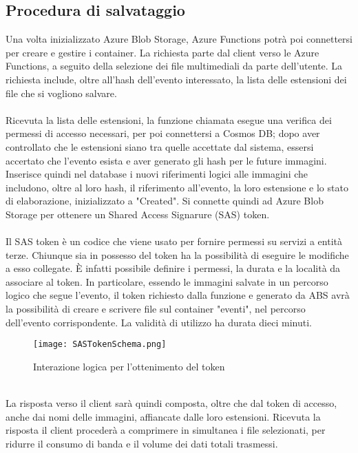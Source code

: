 \subsection{Procedura di salvataggio}

Una volta inizializzato Azure Blob Storage,
Azure Functions potrà poi connettersi per creare e gestire i container.
La richiesta parte dal client verso le Azure Functions, 
a seguito della selezione dei file multimediali da parte dell'utente.
La richiesta include, oltre all'hash dell'evento interessato, la lista delle estensioni dei file che si vogliono salvare.\\
\\
Ricevuta la lista delle estensioni, 
la funzione chiamata esegue una verifica dei permessi di accesso necessari,
per poi connettersi a Cosmos DB;
dopo aver controllato che le estensioni siano tra quelle accettate dal sistema,
essersi accertato che l'evento esista e aver generato gli hash per le future immagini.
Inserisce quindi nel database i nuovi riferimenti logici alle immagini
che includono, oltre al loro hash, il riferimento all'evento, la loro estensione
e lo stato di elaborazione, inizializzato a "Created".
Si connette quindi ad Azure Blob Storage per ottenere un Shared Access Signarure (SAS) token.\\
\\
Il SAS token è un codice che viene usato per fornire permessi su servizi a entità terze.
Chiunque sia in possesso del token ha la possibilità
di eseguire le modifiche a esso collegate. 
È infatti possibile definire i permessi, la durata e la località da associare al token.
In particolare, essendo le immagini salvate in un percorso logico che segue l'evento,
il token richiesto dalla funzione e generato da ABS 
avrà la possibilità di creare e scrivere file sul container "eventi", 
nel percorso dell'evento corrispondente.
La validità di utilizzo ha durata dieci minuti.\\
\begin{figure}[h!]
    \centering
    \texttt{[image: SASTokenSchema.png]}
    \caption{Interazione logica per l'ottenimento del token}
\end{figure}
\\
La risposta verso il client sarà quindi composta, oltre che dal token di accesso, 
anche dai nomi delle immagini, affiancate dalle loro estensioni.
Ricevuta la risposta il client procederà a comprimere in simultanea i file selezionati, 
per ridurre il consumo di banda e il volume dei dati totali trasmessi.
